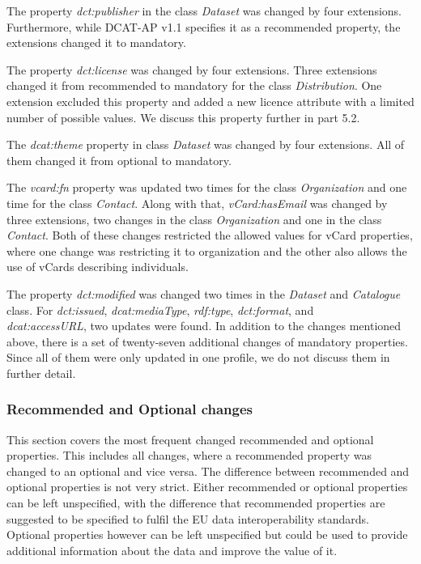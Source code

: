 \documentclass[<options>]{elsarticle}
\begin{document}
The property \textit{dct:publisher} in the class \textit{Dataset} was changed by four extensions. Furthermore, while DCAT-AP v1.1 specifies it as a recommended property, the extensions changed it to mandatory.

The property \textit{dct:license} was changed by four extensions. Three extensions changed it from recommended to mandatory for the class \textit{Distribution}. One extension excluded this property and added a new licence attribute with a limited number of possible values. We discuss this property further in part 5.2.

The \textit{dcat:theme} property in class \textit{Dataset} was changed by four extensions. All of them changed it from optional to mandatory.

The \textit{vcard:fn} property was updated two times for the class \textit{Organization} and one time for the class \textit{Contact}. Along with that, \textit{vCard:hasEmail} was changed by three extensions, two changes in the class \textit{Organization} and one in the class \textit{Contact}. Both of these changes restricted the allowed values for vCard properties, where one change was restricting it to organization and the other also allows the use of vCards describing individuals. 

The property \textit{dct:modified} was changed two times in the \textit{Dataset} and \textit{Catalogue} class. For \textit{dct:issued}, \textit{dcat:mediaType}, \textit{rdf:type}, \textit{dct:format}, and \\ \textit{dcat:accessURL}, two updates were found.
In addition to the changes mentioned above, there is a set of twenty-seven additional changes of mandatory properties. Since all of them were only updated in one profile, we do not discuss them in further detail.

\subsubsection*{Recommended and Optional changes}
This section covers the most frequent changed recommended and optional properties. This includes all changes, where a recommended property was changed to an optional and vice versa. The difference between recommended and optional properties is not very strict. Either recommended or optional properties can be left unspecified, with the difference that recommended properties are suggested to be specified to fulfil the EU data interoperability standards. Optional properties however can be left unspecified but could be used to provide additional information about the data and improve the value of it.  
\end{document}
